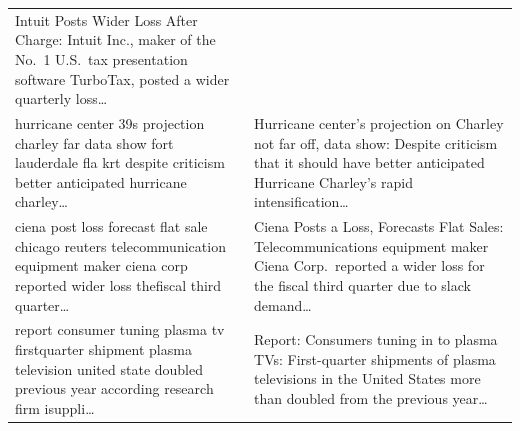 \begin{table}[htbp]
\begin{tabular}{p{0.6\textheight} p{0.6\textheight}}
Intuit Posts Wider Loss After Charge: Intuit Inc., maker of the No.\ 1 U.S.\ tax presentation software TurboTax, posted a wider quarterly loss\ldots \\
\addlinespace
hurricane center 39s projection charley far data show fort lauderdale fla krt despite criticism better anticipated hurricane charley\ldots &
Hurricane center's projection on Charley not far off, data show: Despite criticism that it should have better anticipated Hurricane Charley's rapid intensification\ldots \\
\addlinespace
ciena post loss forecast flat sale chicago reuters telecommunication equipment maker ciena corp reported wider loss thefiscal third quarter\ldots &
Ciena Posts a Loss, Forecasts Flat Sales: Telecommunications equipment maker Ciena Corp.\ reported a wider loss for the fiscal third quarter due to slack demand\ldots \\
\addlinespace
report consumer tuning plasma tv firstquarter shipment plasma television united state doubled previous year according research firm isuppli\ldots &
Report: Consumers tuning in to plasma TVs: First-quarter shipments of plasma televisions in the United States more than doubled from the previous year\ldots \\
\bottomrule
\end{tabular}
\end{table}

\newpage

